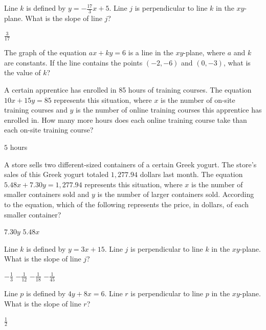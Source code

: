 \question[1]
Line $k$ is defined by $y = -\frac{17}{3}x + 5$. Line $j$ is perpendicular to line $k$ in the $xy$-plane. What is the slope of line $j$?
\begin{solutionorbox}
$\frac{3}{17}$
\end{solutionorbox}


\question[1]
The graph of the equation $ax + ky = 6$ is a line in the $xy$-plane, where $a$ and $k$ are constants. If the line contains the points $(-2, -6)$ and $(0, -3)$, what is the value of $k$?
\begin{choices}
\end{choices}

\newpage


\question[1]
A certain apprentice has enrolled in 85 hours of training courses. The equation $10x + 15y = 85$ represents this situation, where $x$ is the number of on-site training courses and $y$ is the number of online training courses this apprentice has enrolled in. How many more hours does each online training course take than each on-site training course?
\begin{solutionorbox}
$5$ hours
\end{solutionorbox}

\question[1]
A store sells two different-sized containers of a certain Greek yogurt. The store's sales of this Greek yogurt totaled $1,277.94$ dollars last month. The equation $5.48x + 7.30y = 1,277.94$ represents this situation, where $x$ is the number of smaller containers sold and $y$ is the number of larger containers sold. According to the equation, which of the following represents the price, in dollars, of each smaller container?
\begin{choices}
  \choice $7.30y$
  \choice $5.48x$
\end{choices}


\question[1]
Line $k$ is defined by $y = 3x + 15$. Line $j$ is perpendicular to line $k$ in the $xy$-plane. What is the slope of line $j$?
\begin{choices}
  \CorrectChoice $-\frac{1}{3}$
  \choice $-\frac{1}{12}$
  \choice $-\frac{1}{18}$
  \choice $-\frac{1}{45}$
\end{choices}


\newpage



\question[1]
Line $p$ is defined by $4y + 8x = 6$. Line $r$ is perpendicular to line $p$ in the $xy$-plane. What is the slope of line $r$?
\begin{solutionorbox}
$\frac{1}{2}$
\end{solutionorbox}

